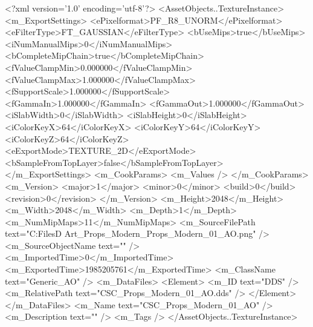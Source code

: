 <?xml version='1.0' encoding='utf-8'?>
<AssetObjects..TextureInstance>
  <m_ExportSettings>
    <ePixelformat>PF_R8_UNORM</ePixelformat>
    <eFilterType>FT_GAUSSIAN</eFilterType>
    <bUseMips>true</bUseMips>
    <iNumManualMips>0</iNumManualMips>
    <bCompleteMipChain>true</bCompleteMipChain>
    <fValueClampMin>0.000000</fValueClampMin>
    <fValueClampMax>1.000000</fValueClampMax>
    <fSupportScale>1.000000</fSupportScale>
    <fGammaIn>1.000000</fGammaIn>
    <fGammaOut>1.000000</fGammaOut>
    <iSlabWidth>0</iSlabWidth>
    <iSlabHeight>0</iSlabHeight>
    <iColorKeyX>64</iColorKeyX>
    <iColorKeyY>64</iColorKeyY>
    <iColorKeyZ>64</iColorKeyZ>
    <eExportMode>TEXTURE_2D</eExportMode>
    <bSampleFromTopLayer>false</bSampleFromTopLayer>
  </m_ExportSettings>
  <m_CookParams>
    <m_Values />
  </m_CookParams>
  <m_Version>
    <major>1</major>
    <minor>0</minor>
    <build>0</build>
    <revision>0</revision>
  </m_Version>
  <m_Height>2048</m_Height>
  <m_Width>2048</m_Width>
  <m_Depth>1</m_Depth>
  <m_NumMipMaps>11</m_NumMipMaps>
  <m_SourceFilePath text="C:\Users\Shadow\Desktop\Working Files\3D Art\Textures\CSC_Props_Modern\Current\textures\CSC_Props_Modern_01_AO.png" />
  <m_SourceObjectName text="" />
  <m_ImportedTime>0</m_ImportedTime>
  <m_ExportedTime>1985205761</m_ExportedTime>
  <m_ClassName text="Generic_AO" />
  <m_DataFiles>
    <Element>
      <m_ID text="DDS" />
      <m_RelativePath text="CSC_Props_Modern_01_AO.dds" />
    </Element>
  </m_DataFiles>
  <m_Name text="CSC_Props_Modern_01_AO" />
  <m_Description text="" />
  <m_Tags />
</AssetObjects..TextureInstance>